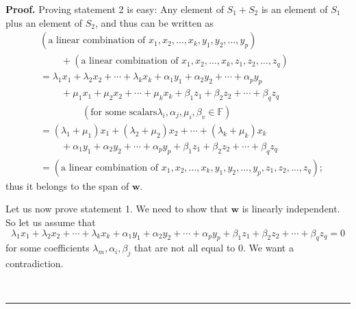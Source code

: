 \documentclass[numbers=enddot,12pt,final,onecolumn,notitlepage]{scrartcl}%
\numberwithin{exer}{subsection}
\theoremstyle{definition}
\newenvironment{proof}[1][Proof]{\noindent\textbf{#1.} }{\ \rule{0.5em}{0.5em}}
\begin{document}
\begin{proof}
Proving statement 2 is easy: Any element of $S_{1}+S_{2}$ is an element of
$S_{1}$ plus an element of $S_{2}$, and thus can be written as
\begin{align*}
&  \left(  \text{a linear combination of }x_{1},x_{2},\ldots,x_{k},y_{1}%
,y_{2},\ldots,y_{p}\right) \\
&  \ \ \ \ \ \ \ \ \ \ +\left(  \text{a linear combination of }x_{1}%
,x_{2},\ldots,x_{k},z_{1},z_{2},\ldots,z_{q}\right) \\
&  =\lambda_{1}x_{1}+\lambda_{2}x_{2}+\cdots+\lambda_{k}x_{k}+\alpha_{1}%
y_{1}+\alpha_{2}y_{2}+\cdots+\alpha_{p}y_{p}\\
&  \ \ \ \ \ \ \ \ \ \ +\mu_{1}x_{1}+\mu_{2}x_{2}+\cdots+\mu_{k}x_{k}%
+\beta_{1}z_{1}+\beta_{2}z_{2}+\cdots+\beta_{q}z_{q}\\
&  \ \ \ \ \ \ \ \ \ \ \ \ \ \ \ \ \ \ \ \ \left(  \text{for some scalars
}\lambda_{i},\alpha_{j},\mu_{i},\beta_{v}\in\mathbb{F}\right) \\
&  =\left(  \lambda_{1}+\mu_{1}\right)  x_{1}+\left(  \lambda_{2}+\mu
_{2}\right)  x_{2}+\cdots+\left(  \lambda_{k}+\mu_{k}\right)  x_{k}\\
&  \ \ \ \ \ \ \ \ \ \ +\alpha_{1}y_{1}+\alpha_{2}y_{2}+\cdots+\alpha_{p}%
y_{p}+\beta_{1}z_{1}+\beta_{2}z_{2}+\cdots+\beta_{q}z_{q}\\
&  =\left(  \text{a linear combination of }x_{1},x_{2},\ldots,x_{k}%
,y_{1},y_{2},\ldots,y_{p},z_{1},z_{2},\ldots,z_{q}\right)  ;
\end{align*}
thus it belongs to the span of $\mathbf{w}$.

Let us now prove statement 1. We need to show that $\mathbf{w}$ is linearly
independent. So let us assume that%
\[
\lambda_{1}x_{1}+\lambda_{2}x_{2}+\cdots+\lambda_{k}x_{k}+\alpha_{1}%
y_{1}+\alpha_{2}y_{2}+\cdots+\alpha_{p}y_{p}+\beta_{1}z_{1}+\beta_{2}%
z_{2}+\cdots+\beta_{q}z_{q}=0
\]
for some coefficients $\lambda_{m},\alpha_{i},\beta_{j}$ that are not all
equal to $0$. We want a contradiction.


\end{proof}
\end{document}
